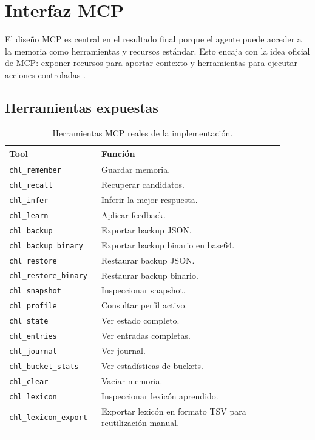 \documentclass[11pt]{article}
\newcommand{\MCP}{\textsc{MCP}}
\begin{document}
\section{Interfaz \MCP{}}

El diseño \MCP{} es central en el resultado final porque el agente puede acceder a la memoria como herramientas y recursos estándar. Esto encaja con la idea oficial de \MCP{}: exponer recursos para aportar contexto y herramientas para ejecutar acciones controladas \cite{mcpResources,mcpTools}.

\subsection{Herramientas expuestas}

\begin{longtable}{p{0.28\linewidth}p{0.62\linewidth}}
\toprule
\textbf{Tool} & \textbf{Función} \\
\midrule
\texttt{chl\_remember} & Guardar memoria. \\
\texttt{chl\_recall} & Recuperar candidatos. \\
\texttt{chl\_infer} & Inferir la mejor respuesta. \\
\texttt{chl\_learn} & Aplicar feedback. \\
\texttt{chl\_backup} & Exportar backup JSON. \\
\texttt{chl\_backup\_binary} & Exportar backup binario en base64. \\
\texttt{chl\_restore} & Restaurar backup JSON. \\
\texttt{chl\_restore\_binary} & Restaurar backup binario. \\
\texttt{chl\_snapshot} & Inspeccionar snapshot. \\
\texttt{chl\_profile} & Consultar perfil activo. \\
\texttt{chl\_state} & Ver estado completo. \\
\texttt{chl\_entries} & Ver entradas completas. \\
\texttt{chl\_journal} & Ver journal. \\
\texttt{chl\_bucket\_stats} & Ver estadísticas de buckets. \\
\texttt{chl\_clear} & Vaciar memoria. \\
\texttt{chl\_lexicon} & Inspeccionar lexicón aprendido. \\
\texttt{chl\_lexicon\_export} & Exportar lexicón en formato TSV para reutilización manual. \\
\bottomrule
\caption{Herramientas \MCP{} reales de la implementación.}
\end{longtable}
\end{document}
